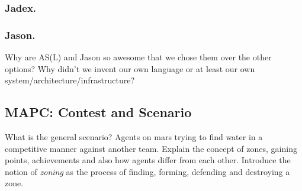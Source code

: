 \subsubsection{Jadex.}



\subsubsection{Jason.}
Why are AS(L) and Jason so awesome that we chose them over the other options? Why didn't we invent our own language or at least our own system/architecture/infrastructure?
\subsection{MAPC: Contest and Scenario}
What is the general scenario? Agents on mars trying to find water in a competitive manner against another team. Explain the concept of zones, gaining points, achievements and also how agents differ from each other. Introduce the notion of \emph{zoning} as the process of finding, forming, defending and destroying a zone.
